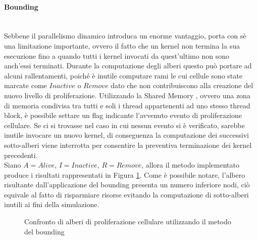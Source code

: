 \paragraph{Bounding}\mbox{}
\\
Sebbene il parallelismo dinamico introduca un enorme vantaggio, porta con sè
una limitazione importante, ovvero il fatto che un kernel non termina la sua
esecuzione fino a quando tutti i kernel invocati da quest'ultimo non sono
anch'essi terminati. Durante la computazione degli alberi questo può portare
ad alcuni rallentamenti, poiché è inutile computare rami le cui cellule
sono state marcate come $Inactive$ o $Remove$ dato che non contribuiscono
alla creazione del nuovo livello di proliferazione.
Utilizzando la Shared Memory\cite{sanders2010cuda}
, ovvero una zona di memoria condivisa tra tutti e soli i thread appartenenti ad
uno stesso thread block, è possibile
settare un flag indicante l'avvenuto evento di proliferazione
cellulare. Se ci si trovasse nel caso in cui nessun evento si è verificato,
sarebbe inutile invocare un nuovo kernel, di conseguenza
la computazione dei successivi sotto-alberi viene interrotta per consentire
la preventiva terminazione dei kernel precedenti.
\\
Siano $A = Alive$, $I = Inactive$, $R = Remove$, allora il metodo implementato
produce i risultati rappresentati in Figura \ref{fig:tree-bounding}.
Come è possibile notare,
l'albero risultante dall'applicazione del
bounding presenta un numero inferiore nodi, ciò equivale al fatto di risparmiare
risorse evitando la computazione di sotto-alberi inutili ai fini della
simulazione.
\begin{figure}[t]
\begin{minipage}[b]{.5\linewidth}
\centering
{}
\end{minipage}
\begin{minipage}[b]{.5\linewidth}
\centering
{}
\end{minipage}
\caption{Confronto di alberi di proliferazione cellulare utilizzando il metodo
    del bounding}
\label{fig:tree-bounding}
\end{figure}
